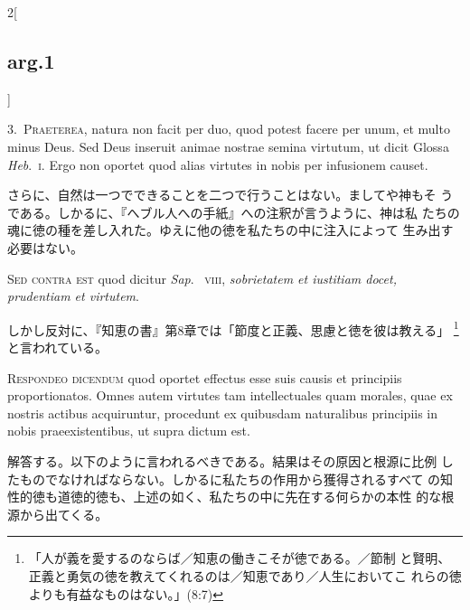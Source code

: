 \documentclass[paper=a4paper,fontsize=10pt,jafontsize=9pt,titlepage]{jlreq}
\begin{document}
\begin{paracol}{2}[\subsection{arg.1}]

3.~{\scshape Praeterea}, natura non facit per duo, quod potest facere
per unum, et multo minus Deus. Sed Deus inseruit animae nostrae semina
virtutum, ut dicit Glossa {\itshape Heb}.~{\scshape i}. Ergo non
oportet quod alias virtutes in nobis per infusionem causet.

\switchcolumn

さらに、自然は一つでできることを二つで行うことはない。ましてや神もそ
 うである。しかるに、『へブル人への手紙』への注釈が言うように、神は私
 たちの魂に徳の種を差し入れた。ゆえに他の徳を私たちの中に注入によって
 生み出す必要はない。

\switchcolumn*[\subsection{s.c.}]

{\scshape Sed contra est} quod dicitur {\itshape Sap}.~{\scshape
viii}, {\itshape sobrietatem et iustitiam docet, prudentiam et
virtutem}.

\switchcolumn

しかし反対に、『知恵の書』第8章では「節度と正義、思慮と徳を彼は教える」
 \footnote{「人が義を愛するのならば／知恵の働きこそが徳である。／節制
 と賢明、正義と勇気の徳を教えてくれるのは／知恵であり／人生においてこ
 れらの徳よりも有益なものはない。」(8:7)} と言われている。


{\scshape Respondeo dicendum} quod oportet effectus esse suis causis
et principiis proportionatos. Omnes autem virtutes tam intellectuales
quam morales, quae ex nostris actibus acquiruntur, procedunt ex
quibusdam naturalibus principiis in nobis praeexistentibus, ut supra
 dictum est.

\switchcolumn

解答する。以下のように言われるべきである。結果はその原因と根源に比例
 したものでなければならない。しかるに私たちの作用から獲得されるすべて
 の知性的徳も道徳的徳も、上述の如く、私たちの中に先在する何らかの本性
 的な根源から出てくる。

\switchcolumn*


\end{paracol}
\end{document}
